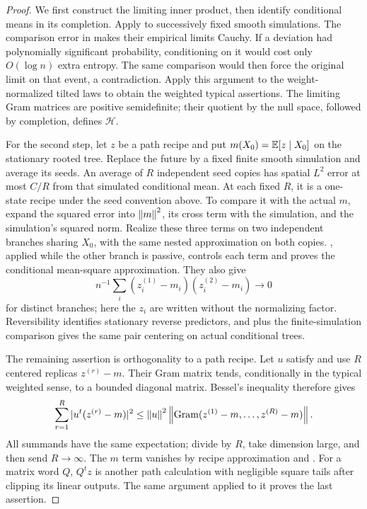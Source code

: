 \begin{proof}
We first construct the limiting inner product, then identify
conditional means in its completion.  Apply
 to successively fixed
smooth simulations.  The comparison error in
 makes their empirical limits Cauchy.
If a deviation had polynomially significant probability, conditioning
on it would cost only $O(\log n)$ extra entropy.  The same comparison
would then force the original limit on that event, a contradiction.
Apply this argument to the weight-normalized tilted laws to obtain
the weighted typical assertions.  The limiting Gram matrices are
positive semidefinite; their quotient by the null space, followed by
completion, defines $\mathcal H$.

For the second step, let $z$ be a path recipe and put
$m(X_0)=\mathbb E[z\mid X_0]$ on the stationary rooted tree.  Replace the
future by a fixed finite smooth simulation and average its seeds.
An average of $R$ independent seed copies has spatial $L^2$ error
at most $C/R$ from that simulated conditional mean.  At each fixed
$R$, it is a one-state recipe under the seed convention above.
To compare it with the actual $m$, expand the squared error into
$\left\lVert m\right\rVert^2$, its cross term with the simulation, and the simulation's
squared norm.  Realize these three terms on two independent branches
sharing $X_0$, with the same nested approximation on both copies.
, applied while the other branch is
passive, controls each term and proves the conditional mean-square
approximation.
They also give
\[
 n^{-1}\sum_i(z_i^{(1)}-m_i)(z_i^{(2)}-m_i)\longrightarrow0
\]
for distinct branches; here the $z_i$ are written without the
normalizing factor.  Reversibility identifies stationary reverse
predictors, and  plus the finite-simulation
comparison gives the same pair centering on actual conditional trees.

The remaining assertion is orthogonality to a path recipe.  Let $u$
satisfy  and use $R$ centered replicas
$z^{(r)}-m$.  Their Gram matrix tends, conditionally in the typical
weighted sense, to a bounded diagonal matrix.  Bessel's inequality
therefore gives
\[
 \sum_{r=1}^R|u^t(z^{(r)}-m)|^2
 \le \left\lVert u\right\rVert^2\left\lVert \operatorname{Gram}(z^{(1)}-m,\ldots,z^{(R)}-m)\right\rVert.
\]
All summands have the same expectation; divide by $R$, take dimension
large, and then send $R\to\infty$.  The $m$ term vanishes by recipe
approximation and .  For a matrix word $Q$,
$Q^tz$ is another path calculation with negligible square tails after
clipping its linear outputs.  The same argument applied to it proves
the last assertion.
\end{proof}

